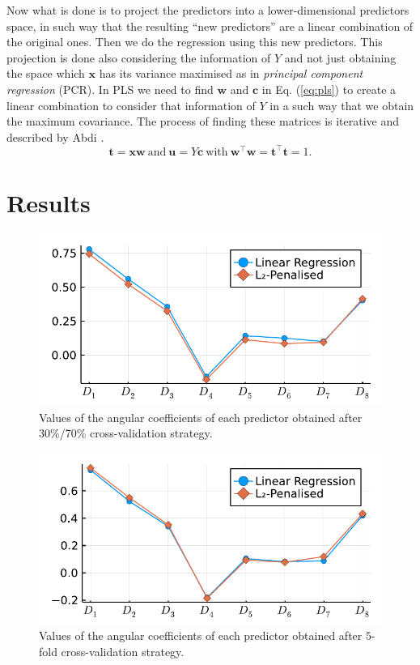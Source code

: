 \documentclass[conference]{IEEEtran}
\begin{document}
Now what is done is to project the predictors into a lower-dimensional predictors space, in such way that the resulting ``new predictors'' are a linear combination of the original ones. Then we do the regression using this new predictors. This projection is done also considering the information of $Y$ and not just obtaining the space which $\mathbf{x}$ has its variance maximised as in \emph{principal component regression} (PCR). In PLS we need to find $\mathbf{w}$ and $\mathbf{c}$ in Eq. (\ref{eq:pls}) to create a linear combination to consider that information of $Y$ in a such way that we obtain the maximum covariance. The process of finding these matrices is iterative and described by Abdi \cite{b5}.
%
\begin{equation}
\mathbf{t} = \mathbf{x}\mathbf{w}\ \text{and}\ \mathbf{u}=Y\mathbf{c}\ \text{with}\ \textbf{w}^\top\textbf{w}=\textbf{t}^\top\textbf{t}=1.
\label{eq:pls}
\end{equation}

\section{Results}

\begin{figure}[htbp]
\centerline{\includegraphics[width=\columnwidth]{../figures/fitted_params_70}}
\caption{Values of the angular coefficients of each predictor obtained after 30\%/70\% cross-validation strategy.}
\end{figure}

\begin{figure}[htbp]
\centerline{\includegraphics[width=\columnwidth]{../figures/fitted_params_kfolds}}
\caption{Values of the angular coefficients of each predictor obtained after $5$-fold cross-validation strategy.}%
\end{figure}
\end{document}
